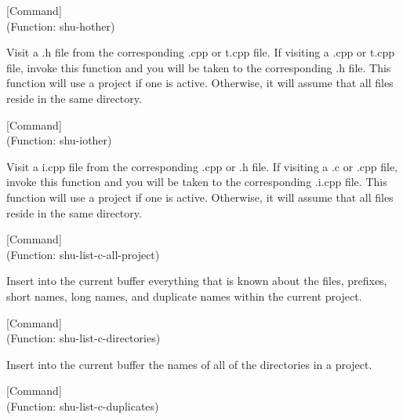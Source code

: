 \vspace{1em}
\noindent
{}
\usebox{\funcname}
 \hfill [Command]\\%
 (Function: shu-hother)

\begin{doc-string}
Visit a .h file from the corresponding .cpp or t.cpp file.  If visiting a
.cpp or t.cpp file, invoke this function and you will be taken to the
corresponding .h file.  This function will use a project if one is active.
Otherwise, it will assume that all files reside in the same directory.
\end{doc-string}

\vspace{1em}
\noindent
{}
\usebox{\funcname}
 \hfill [Command]\\%
 (Function: shu-iother)

\begin{doc-string}
Visit a i.cpp file from the corresponding .cpp or .h file.  If visiting a .c
or .cpp file, invoke this function and you will be taken to the corresponding
.i.cpp file.  This function will use a project if one is active.  Otherwise, it
will assume that all files reside in the same directory.
\end{doc-string}

\vspace{1em}
\noindent
{}
\usebox{\funcname}
 \hfill [Command]\\%
 (Function: shu-list-c-all-project)

\begin{doc-string}
Insert into the current buffer everything that is known about the files,
prefixes, short names, long names, and duplicate names within the current
project.
\end{doc-string}

\vspace{1em}
\noindent
{}
\usebox{\funcname}
 \hfill [Command]\\%
 (Function: shu-list-c-directories)

\begin{doc-string}
Insert into the current buffer the names of all of the directories in a project.
\end{doc-string}

\vspace{1em}
\noindent
{}
\usebox{\funcname}
 \hfill [Command]\\%
 (Function: shu-list-c-duplicates)

